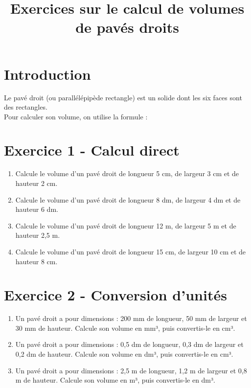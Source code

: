 \documentclass[12pt, a4paper]{article}
\title{\color{myblue}\textbf{Exercices sur le calcul de volumes de pavés droits}}
\author{}
\date{}
\begin{document}
\maketitle

\section*{Introduction}
Le pavé droit (ou parallélépipède rectangle) est un solide dont les six faces sont des rectangles.\\
Pour calculer son volume, on utilise la formule :
\begin{center}
\end{center}

\section*{Exercice 1 - Calcul direct}
\begin{enumerate}[label=\textbf{\arabic*.}]
    \item Calcule le volume d'un pavé droit de longueur 5 cm, de largeur 3 cm et de hauteur 2 cm.
    \item Calcule le volume d'un pavé droit de longueur 8 dm, de largeur 4 dm et de hauteur 6 dm.
    \item Calcule le volume d'un pavé droit de longueur 12 m, de largeur 5 m et de hauteur 2,5 m.
    \item Calcule le volume d'un pavé droit de longueur 15 cm, de largeur 10 cm et de hauteur 8 cm.
\end{enumerate}

\section*{Exercice 2 - Conversion d'unités}
\begin{enumerate}[label=\textbf{\arabic*.}]
    \item Un pavé droit a pour dimensions : 200 mm de longueur, 50 mm de largeur et 30 mm de hauteur. Calcule son volume en mm³, puis convertis-le en cm³.
    \item Un pavé droit a pour dimensions : 0,5 dm de longueur, 0,3 dm de largeur et 0,2 dm de hauteur. Calcule son volume en dm³, puis convertis-le en cm³.
    \item Un pavé droit a pour dimensions : 2,5 m de longueur, 1,2 m de largeur et 0,8 m de hauteur. Calcule son volume en m³, puis convertis-le en dm³.
\end{enumerate}
\end{document}
